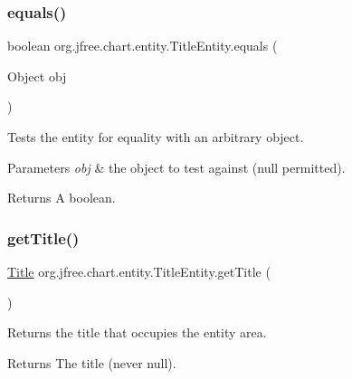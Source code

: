 \subsubsection{\texorpdfstring{equals()}{equals()}}
{\footnotesize\ttfamily boolean org.\+jfree.\+chart.\+entity.\+Title\+Entity.\+equals (\begin{DoxyParamCaption}\item[{Object}]{obj }\end{DoxyParamCaption})}

Tests the entity for equality with an arbitrary object.


\begin{DoxyParams}{Parameters}
{\em obj} & the object to test against ({\ttfamily null} permitted).\\
\hline
\end{DoxyParams}
\begin{DoxyReturn}{Returns}
A boolean. 
\end{DoxyReturn}
\mbox{\label{classorg_1_1jfree_1_1chart_1_1entity_1_1_title_entity_a9da686b4449f12559fff9d82283d6862}} 
\subsubsection{\texorpdfstring{get\+Title()}{getTitle()}}
{\footnotesize\ttfamily \mbox{\hyperlink{classorg_1_1jfree_1_1chart_1_1title_1_1_title}{Title}} org.\+jfree.\+chart.\+entity.\+Title\+Entity.\+get\+Title (\begin{DoxyParamCaption}{ }\end{DoxyParamCaption})}

Returns the title that occupies the entity area.

\begin{DoxyReturn}{Returns}
The title (never {\ttfamily null}). 
\end{DoxyReturn}
\mbox{\label{classorg_1_1jfree_1_1chart_1_1entity_1_1_title_entity_a5af263c61dcfd68d47505f198ef645d7}} 
